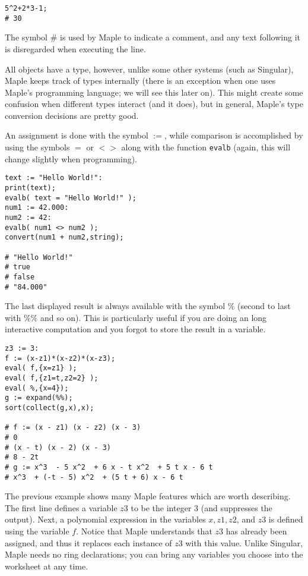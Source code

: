 \documentclass[12pt]{amsart}
\begin{document}
\begin{verbatim}
5^2+2*3-1;
# 30
\end{verbatim}

The symbol \# is used by Maple to indicate a comment, and any text following it is disregarded
when executing the line.

All objects have a type, however, unlike some other systems (such as Singular), Maple keeps track
of types internally (there is an exception when one uses Maple's programming language; we will
see this later on).  This might create some confusion when different types interact (and it does), but in general,
Maple's type conversion decisions are pretty good.

An assignment is done with the symbol $:=$, while comparison is accomplished 
by using the symbols $=$ or $<>$ along with the function \texttt{evalb} (again, this will change slightly
when programming).

\begin{verbatim}
text := "Hello World!":
print(text);
evalb( text = "Hello World!" );
num1 := 42.000:
num2 := 42:
evalb( num1 <> num2 );
convert(num1 + num2,string);

# "Hello World!"
# true
# false
# "84.000"
\end{verbatim}

The last displayed result is always available with the symbol $\%$ (second to last with $\%\%$
and so on).   This is particularly useful if you are doing an long interactive computation 
and you forgot to store the result in a variable.

\begin{verbatim}
z3 := 3:
f := (x-z1)*(x-z2)*(x-z3);
eval( f,{x=z1} );
eval( f,{z1=t,z2=2} );
eval( %,{x=4});
g := expand(%%);
sort(collect(g,x),x);

# f := (x - z1) (x - z2) (x - 3)
# 0
# (x - t) (x - 2) (x - 3)
# 8 - 2t
# g := x^3  - 5 x^2  + 6 x - t x^2  + 5 t x - 6 t
# x^3  + (-t - 5) x^2  + (5 t + 6) x - 6 t
\end{verbatim}   

The previous example shows many Maple features which are worth describing. 
The first line defines a variable $z3$ to be the integer $3$ (and suppresses the output). 
Next, a polynomial expression in the variables
$x,z1,z2$, and $z3$ is defined using the variable $f$.  Notice that Maple 
understands that $z3$ has already been assigned, and thus it replaces each instance of $z3$ with this value.
Unlike Singular, Maple needs no ring declarations; you can bring any variables you choose into the 
worksheet at any time.
\end{document}
